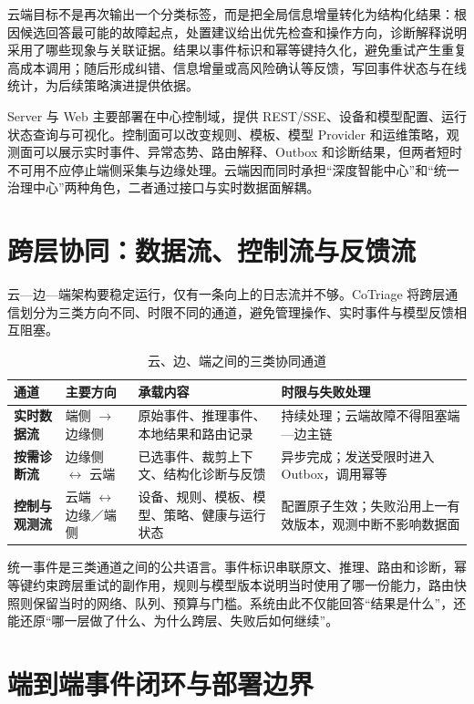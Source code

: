 云端目标不是再次输出一个分类标签，而是把全局信息增量转化为结构化结果：根因候选回答最可能的故障起点，处置建议给出优先检查和操作方向，诊断解释说明采用了哪些现象与关联证据。结果以事件标识和幂等键持久化，避免重试产生重复高成本调用；随后形成纠错、信息增量或高风险确认等反馈，写回事件状态与在线统计，为后续策略演进提供依据。

Server 与 Web 主要部署在中心控制域，提供 REST/SSE、设备和模型配置、运行状态查询与可视化。控制面可以改变规则、模板、模型 Provider 和运维策略，观测面可以展示实时事件、异常态势、路由解释、Outbox 和诊断结果，但两者短时不可用不应停止端侧采集与边缘处理。云端因而同时承担“深度智能中心”和“统一治理中心”两种角色，二者通过接口与实时数据面解耦。

\section{跨层协同：数据流、控制流与反馈流}

云—边—端架构要稳定运行，仅有一条向上的日志流并不够。CoTriage 将跨层通信划分为三类方向不同、时限不同的通道，避免管理操作、实时事件与模型反馈相互阻塞。

\begin{table}[htbp]
  \centering
  \small
  \caption{云、边、端之间的三类协同通道}
  \label{tab:cross-layer-flows}
  \begin{tabularx}{\textwidth}{>{\bfseries}p{} p{} X X}
    \toprule
    通道 & 主要方向 & 承载内容 & 时限与失败处理 \\
    \midrule
    实时数据流 & 端侧 $\rightarrow$ 边缘侧 & 原始事件、推理事件、本地结果和路由记录 & 持续处理；云端故障不得阻塞端—边主链 \\
    按需诊断流 & 边缘侧 $\leftrightarrow$ 云端 & 已选事件、裁剪上下文、结构化诊断与反馈 & 异步完成；发送受限时进入 Outbox，调用幂等 \\
    控制与观测流 & 云端 $\leftrightarrow$ 边缘／端侧 & 设备、规则、模板、模型、策略、健康与运行状态 & 配置原子生效；失败沿用上一有效版本，观测中断不影响数据面 \\
    \bottomrule
  \end{tabularx}
\end{table}

统一事件是三类通道之间的公共语言。事件标识串联原文、推理、路由和诊断，幂等键约束跨层重试的副作用，规则与模型版本说明当时使用了哪一份能力，路由快照则保留当时的网络、队列、预算与门槛。系统由此不仅能回答“结果是什么”，还能还原“哪一层做了什么、为什么跨层、失败后如何继续”。

\section{端到端事件闭环与部署边界}

